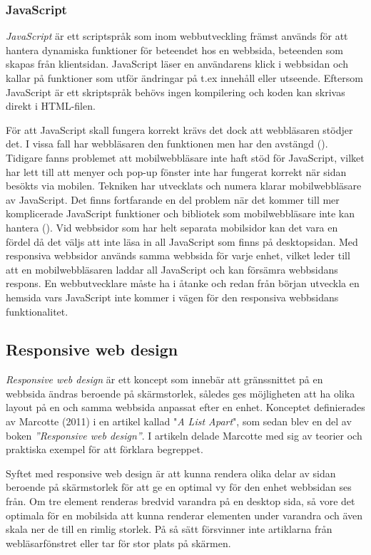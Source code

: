 \documentclass[11pt]{article}
\begin{document}
\subsubsection{JavaScript}
\textit{JavaScript} är ett scriptspråk som inom webbutveckling främst används för att hantera dynamiska funktioner för beteendet hos en webbsida, beteenden som skapas från klientsidan. JavaScript läser en användarens klick i webbsidan och kallar på funktioner som utför ändringar på t.ex innehåll eller utseende. Eftersom JavaScript är ett skriptspråk behövs ingen kompilering och koden kan skrivas direkt i HTML-filen.

För att JavaScript skall fungera korrekt krävs det dock att webbläsaren stödjer det. I vissa fall har webbläsaren den funktionen men har den avstängd (\cite[s.13]{sara_ingmar}). Tidigare fanns problemet att mobilwebbläsare inte haft stöd för JavaScript, vilket har lett till att menyer och pop-up fönster inte har fungerat korrekt när sidan besökts via mobilen. Tekniken har utvecklats och numera klarar mobilwebbläsare av JavaScript. Det finns fortfarande en del problem när det kommer till mer komplicerade JavaScript funktioner och bibliotek som mobilwebbläsare inte kan hantera (\cite{quirksmode}). Vid webbsidor som har helt separata mobilsidor kan det vara en fördel då det väljs att inte läsa in all JavaScript som finns på desktopsidan. Med responsiva webbsidor används samma webbsida för varje enhet, vilket leder till att en mobilwebbläsaren laddar all JavaScript och kan försämra webbsidans respons. En webbutvecklare måste ha i åtanke och redan från början utveckla en hemsida vars JavaScript inte kommer i vägen för den responsiva webbsidans funktionalitet.
\newpage
\subsection{Responsive web design}
\textit{Responsive web design} är ett koncept som innebär att gränssnittet på en webbsida ändras beroende på skärmstorlek, således ges möjligheten att ha olika layout på en och samma webbsida anpassat efter en enhet. Konceptet definierades av Marcotte (2011) i en artikel kallad "\textit{A List Apart}", som sedan blev en del av boken \textit{”Responsive web design”}. I artikeln delade Marcotte med sig av teorier och praktiska exempel för att förklara begreppet. 

Syftet med responsive web design är att kunna rendera olika delar av sidan beroende på skärmstorlek för att ge en optimal vy för den enhet webbsidan ses från. Om tre element renderas bredvid varandra på en desktop sida, så vore det optimala för en mobilsida att kunna renderar elementen under varandra och även skala ner de till en rimlig storlek. På så sätt försvinner inte artiklarna från webläsarfönstret eller tar för stor plats på skärmen.
\end{document}
